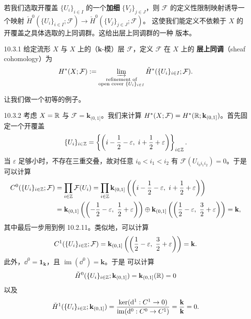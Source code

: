 若我们选取开覆盖 $\{U_i\}_{i\in I}$ 的一个\textbf{加细} $\{V_j\}_{j\in J}$，则
$\mathcal F$ 的定义性限制映射诱导一个映射
$\check H^0(\{U_i\}_{i\in I};\mathcal F)\to\check H^0(\{V_j\}_{j\in J};\mathcal F)$。
这使我们能定义不依赖于 $X$ 的开覆盖之具体选取的上同调群。这给出层上同调群的一种
版本。


\begin{wdefn}{10.3.1}
给定流形 $X$ 与 $X$ 上的（$\mathbf{k}$-模）层 $\mathcal F$，定义 $\mathcal F$ 在 $X$ 上的
\textbf{层上同调}（sheaf cohomology）为
\[
H^*(X;\mathcal F):=
\varinjlim_{\substack{\text{refinement of}\\
\text{open cover }\{U_i\}_{i\in I}}}
\check H^*(\{U_i\}_{i\in I};\mathcal F).
\]
\end{wdefn}

让我们做一个初等的例子。

\begin{wexam}{10.3.2}
考虑 $X=\mathbb{R}$ 与 $\mathcal F=\mathbf{k}_{(0,1]}$。我们来计算
$H^*(X;\mathcal F)=H^*(\mathbb{R};\mathbf{k}_{(0,1]})$。首先固定一个开覆盖
\[
\{U_i\}_{i\in\Z}=
\left\{\left(i-\frac12-\varepsilon,\ i+\frac12+\varepsilon\right)\right\}_{i\in\Z}.
\]
当 $\varepsilon$ 足够小时，不存在三重交叠，故对任意 $i_0<i_1<i_2$ 有
$\mathcal F(U_{i_0i_1i_2})=0$。于是可以计算
\begin{align*}
C^0(\{U_i\}_{i\in\Z};\mathcal F)
&=\prod_{i\in\Z}\mathcal F(U_i)
=\prod_{i\in\Z}\mathbf{k}_{(0,1]}
\left(\left(i-\frac12-\varepsilon,\ i+\frac12+\varepsilon\right)\right)\\
&=\mathbf{k}_{(0,1]}\left(\left(-\frac12-\varepsilon,\ \frac12+\varepsilon\right)\right)
\oplus\mathbf{k}_{(0,1]}\left(\left(\frac12-\varepsilon,\ \frac32+\varepsilon\right)\right)
=\mathbf{k},
\end{align*}
其中最后一步用到例 10.2.11。类似地，可以计算
\[
C^1(\{U_i\}_{i\in\Z};\mathcal F)
=\mathbf{k}_{(0,1]}\left(\left(\frac12-\varepsilon,\ \frac32+\varepsilon\right)\right)
=\mathbf{k}.
\]
此外，$\dd^0=\mathbf 1_{\mathbf k}$，且 $\operatorname{im}(\dd^0)=\mathbf k$。于是
可以计算
\[
\check H^0(\{U_i\}_{i\in\mathbb{Z}};\mathbf{k}_{(0,1]})
=\mathbf{k}_{(0,1]}(\mathbb{R})=0
\]
以及
\[
\check H^1(\{U_i\}_{i\in\mathbb{Z}};\mathbf{k}_{(0,1]})
=\frac{\ker(\mathrm{d}^1:C^1\to0)}
{\operatorname{im}(\mathrm{d}^0:C^0\to C^1)}=\frac{\mathbf k}{\mathbf k}=0.
\]
\end{wexam}

